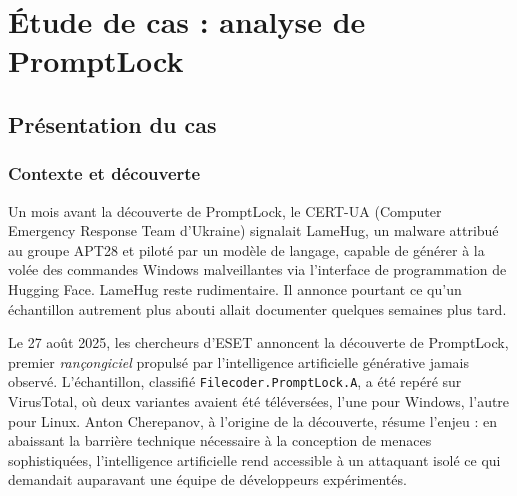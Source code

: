 %
%
%

\chapter{Étude de cas : analyse de PromptLock}

\section{Présentation du cas}

\subsection{Contexte et découverte}

Un mois avant la découverte de PromptLock, le CERT-UA (Computer Emergency Response Team d'Ukraine) signalait LameHug, un malware attribué au groupe APT28 et piloté par un modèle de langage, capable de générer à la volée des commandes Windows malveillantes via l'interface de programmation de Hugging Face. LameHug reste rudimentaire. Il annonce pourtant ce qu'un échantillon autrement plus abouti allait documenter quelques semaines plus tard.

Le 27 août 2025, les chercheurs d'ESET annoncent la découverte de PromptLock, premier \emph{rançongiciel} propulsé par l'intelligence artificielle générative jamais observé. L'échantillon, classifié \texttt{Filecoder.PromptLock.A}, a été repéré sur VirusTotal, où deux variantes avaient été téléversées, l'une pour Windows, l'autre pour Linux. Anton Cherepanov, à l'origine de la découverte, résume l'enjeu : en abaissant la barrière technique nécessaire à la conception de menaces sophistiquées, l'intelligence artificielle rend accessible à un attaquant isolé ce qui demandait auparavant une équipe de développeurs expérimentés.

